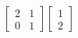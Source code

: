 \documentclass[preview]{standalone}
\begin{document}
\begin{align*}
\begin{bmatrix} 2 & 1 \\ 0 & 1 \end{bmatrix} \begin{bmatrix} 1 \\ 2 \end{bmatrix}
\end{align*}
\end{document}
